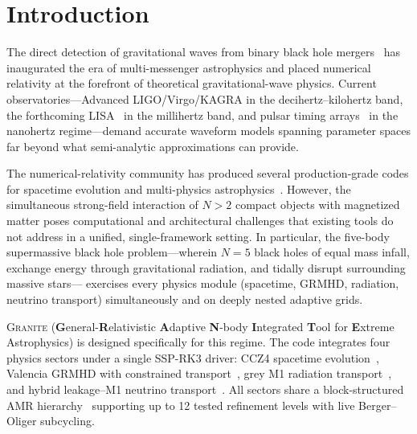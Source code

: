 \documentclass[aps,prd,twocolumn,superscriptaddress,nofootinbib,showpacs,
               longbibliography]{revtex4-2}
\newcommand{\granite}{\textsc{Granite}}
\begin{document}
\begin{abstract}
\granite{} is publicly available under the GPL-3.0 license at
\url{https://github.com/LiranOG/Granite-NR}, archived at Zenodo with
DOI~\href{https://doi.org/10.5281/zenodo.19502265}{10.5281/zenodo.19502265}.
\end{abstract}


\maketitle

\section{Introduction}
\label{sec:intro}

The direct detection of gravitational waves from binary black hole
mergers~\cite{Abbott2016} has inaugurated the era of multi-messenger
astrophysics and placed numerical relativity at the forefront of
theoretical gravitational-wave physics.
Current observatories---Advanced LIGO/Virgo/KAGRA in the
decihertz--kilohertz band, the forthcoming LISA~\cite{AmaroSeoane2017} in
the millihertz band, and pulsar timing arrays~\cite{Agazie2023} in the
nanohertz regime---demand accurate waveform models spanning parameter spaces
far beyond what semi-analytic approximations can provide.

The numerical-relativity community has produced several
production-grade codes for spacetime evolution and multi-physics
astrophysics~\cite{Loffler2012,Porth2017,Stone2020}.
However, the simultaneous strong-field interaction of $N > 2$ compact
objects with magnetized matter poses computational and architectural
challenges that existing tools do not address in a unified,
single-framework setting.
In particular, the five-body supermassive black hole problem---wherein
$N = 5$ black holes of equal mass infall, exchange energy through
gravitational radiation, and tidally disrupt surrounding massive stars---
exercises every physics module (spacetime, GRMHD, radiation, neutrino
transport) simultaneously and on deeply nested adaptive grids.

\granite{} (\textbf{G}eneral-\textbf{R}elativistic \textbf{A}daptive
\textbf{N}-body \textbf{I}ntegrated \textbf{T}ool for \textbf{E}xtreme
Astrophysics) is designed specifically for this regime.
The code integrates four physics sectors under a single SSP-RK3 driver:
CCZ4 spacetime evolution~\cite{Alic2012}, Valencia GRMHD with constrained
transport~\cite{Banyuls1997}, grey M1 radiation
transport~\cite{Minerbo1978,Foucart2015}, and hybrid leakage--M1 neutrino
transport~\cite{Ruffert1996,Perego2016}.
All sectors share a block-structured AMR hierarchy~\cite{BergerOliger1984}
supporting up to 12 tested refinement levels with live Berger--Oliger
subcycling.
\end{document}
